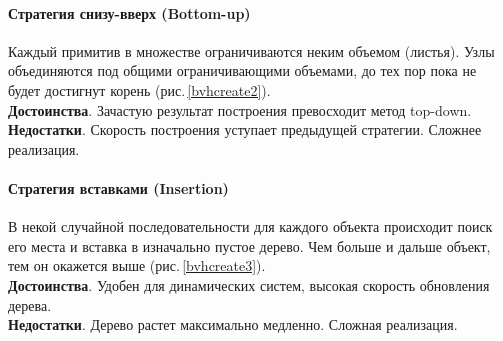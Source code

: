 \documentclass[11pt,a4paper]{extarticle}
\begin{document}
			\paragraph{Стратегия снизу-вверх (Bottom-up)}
			Каждый примитив в множестве ограничиваются неким объемом (листья).
			Узлы объединяются под общими ограничивающими объемами, до тех пор пока не будет достигнут корень (рис.\,\ref{bvhcreate2}).\\
			\textbf{Достоинства}. Зачастую результат построения превосходит метод top-down.\\
			\textbf{Недостатки}. Скорость построения уступает предыдущей стратегии. Сложнее реализация.

			\paragraph{Стратегия вставками (Insertion)}
			В некой случайной последовательности для каждого объекта происходит поиск его места и вставка в изначально пустое дерево.
			Чем больше и дальше объект, тем он окажется выше (рис.\,\ref{bvhcreate3}).\\
			\textbf{Достоинства}. Удобен для динамических систем, высокая скорость обновления дерева.\\
			\textbf{Недостатки}. Дерево растет максимально медленно. Сложная реализация.
\end{document}
